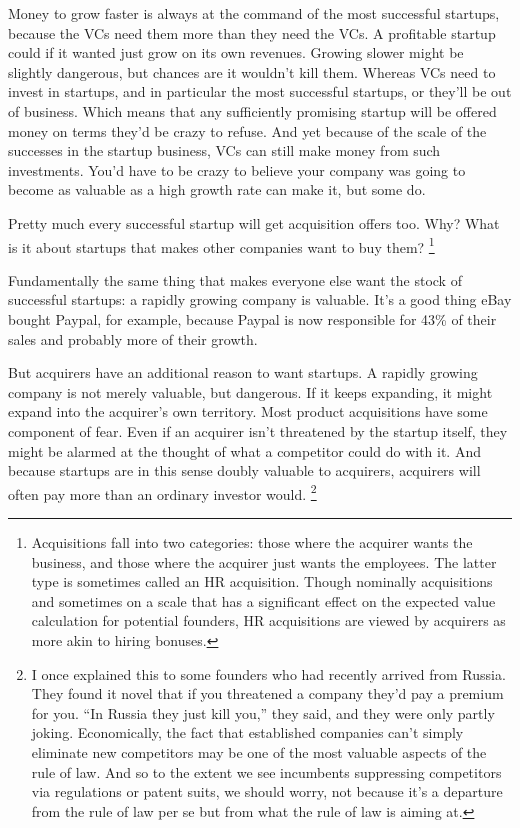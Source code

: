 \documentclass[12pt]{book}
\begin{document}
Money to grow faster is always at the command of the most successful
startups, because the VCs need them more than they need the VCs. A
profitable startup could if it wanted just grow on its own revenues.
Growing slower might be slightly dangerous, but chances are it wouldn't
kill them. Whereas VCs need to invest in startups, and in particular the
most successful startups, or they'll be out of business. Which means
that any sufficiently promising startup will be offered money on terms
they'd be crazy to refuse. And yet because of the scale of the successes
in the startup business, VCs can still make money from such investments.
You'd have to be crazy to believe your company was going to become as
valuable as a high growth rate can make it, but some do.

Pretty much every successful startup will get acquisition offers too.
Why? What is it about startups that makes other companies want to buy
them? \footnote{Acquisitions fall into two categories: those where the acquirer
wants the business, and those where the acquirer just wants the
employees. The latter type is sometimes called an HR acquisition. Though
nominally acquisitions and sometimes on a scale that has a significant
effect on the expected value calculation for potential founders, HR
acquisitions are viewed by acquirers as more akin to hiring bonuses.}

Fundamentally the same thing that makes everyone else want the stock of
successful startups: a rapidly growing company is valuable. It's a good
thing eBay bought Paypal, for example, because Paypal is now responsible
for 43\% of their sales and probably more of their growth.

But acquirers have an additional reason to want startups. A rapidly
growing company is not merely valuable, but dangerous. If it keeps
expanding, it might expand into the acquirer's own territory. Most
product acquisitions have some component of fear. Even if an acquirer
isn't threatened by the startup itself, they might be alarmed at the
thought of what a competitor could do with it. And because startups are
in this sense doubly valuable to acquirers, acquirers will often pay
more than an ordinary investor would. \footnote{I once explained this to some founders who had recently arrived
from Russia. They found it novel that if you threatened a company they'd
pay a premium for you. ``In Russia they just kill you,'' they said, and
they were only partly joking. Economically, the fact that established
companies can't simply eliminate new competitors may be one of the most
valuable aspects of the rule of law. And so to the extent we see
incumbents suppressing competitors via regulations or patent suits, we
should worry, not because it's a departure from the rule of law per se
but from what the rule of law is aiming at.}
\end{document}

